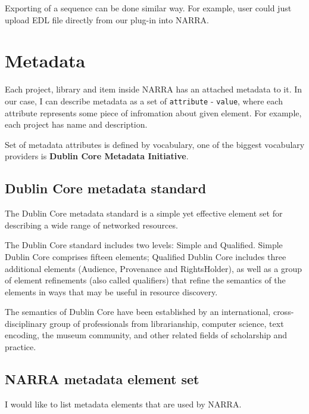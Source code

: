 \documentclass[thesis=B,english]{FITthesis}[2012/10/20]
\begin{document}
Exporting of a sequence can be done similar way. For example, user could just upload EDL file directly from our plug-in into NARRA.

\section{Metadata}
Each project, library and item inside NARRA has an attached metadata to it. In our case, I can describe metadata as a set of \texttt{attribute} - \texttt{value}, where each attribute represents some piece of infromation about given element. For example, each project has name and description.

Set of metadata attributes is defined by vocabulary, one of the biggest vocabulary providers is \textbf{Dublin Core Metadata Initiative}.
\subsection{Dublin Core metadata standard}
The Dublin Core metadata standard is a simple yet effective element set for describing a wide range of networked resources.

The Dublin Core standard includes two levels: Simple and Qualified. Simple Dublin Core comprises fifteen elements; Qualified Dublin Core includes three additional elements (Audience, Provenance and RightsHolder), as well as a group of element refinements (also called qualifiers) that refine the semantics of the elements in ways that may be useful in resource discovery. 

The semantics of Dublin Core have been established by an international, cross-disciplinary group of professionals from librarianship, computer science, text encoding, the museum community, and other related fields of scholarship and practice.\cite{dublincore}

\subsection{NARRA metadata element set}
I would like to list metadata elements that are used by NARRA.
\end{document}
